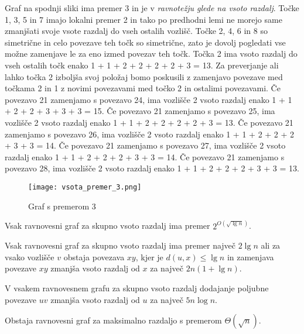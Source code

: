 \documentclass[fin1, tisk]{fmfdelo}
\begin{document}
\begin{dokaz}
Graf na spodnji sliki ima premer 3 in je v \textit{ravnotežju glede na vsoto razdalj}. Točke 1, 3, 5 in 7 imajo lokalni premer 2 in tako po predhodni lemi ne morejo same zmanjšati svoje vsote razdalj do vseh ostalih vozlišč. Točke 2, 4, 6 in 8 so simetrične in celo povezave teh točk so simetrične, zato je dovolj pogledati vse možne zamenjave le za eno izmed povezav teh točk. Točka 2 ima vsoto razdalj do vseh ostalih točk enako 1 + 1 + 2 + 2 + 2 + 2 + 3 = 13. Za preverjanje ali lahko točka 2 izboljša svoj položaj bomo poskusili z zamenjavo povezave med točkama 2 in 1 z novimi povezavami med točko 2 in ostalimi povezavami. Če povezavo 21 zamenjamo s povezavo 24, ima vozlišče 2 vsoto razdalj enako 1 + 1 + 2 + 2 + 3 + 3 + 3 = 15. Če povezavo 21 zamenjamo s povezavo 25, ima vozlišče 2 vsoto razdalj enako 1 + 1 + 2 + 2 + 2 + 2 + 3 = 13. Če povezavo 21 zamenjamo s povezavo 26, ima vozlišče 2 vsoto razdalj enako 1 + 1 + 2 + 2 + 2 + 3 + 3 = 14. Če povezavo 21 zamenjamo s povezavo 27, ima vozlišče 2 vsoto razdalj enako 1 + 1 + 2 + 2 + 2 + 3 + 3 = 14. Če povezavo 21 zamenjamo s povezavo 28, ima vozlišče 2 vsoto razdalj enako 1 + 1 + 2 + 2 + 2 + 3 + 3 = 13.
\end{dokaz}

\begin{figure}[h]
    \centering
    \texttt{[image: vsota\_premer\_3.png]}
    \caption{Graf s premerom 3}
\end{figure}

\begin{izrek}
Vsak ravnovesni graf za skupno vsoto razdalj ima premer \(2^{O(\sqrt{\lg n})}\).
\end{izrek}

\begin{lema}
Vsak ravnovesni graf za skupno vsoto razdalj ima premer največ \(2 \lg n\) ali za vsako vozlišče \(v\) obstaja povezava \(xy\), kjer je \(d(u, x) \leq \lg n\) in zamenjava povezave \(xy\) zmanjša vsoto razdalj od \(x\) za največ \(2n(1 + \lg n)\).
\end{lema}

\begin{lema}
V vsakem ravnovesnem grafu za skupno vsoto razdalj dodajanje poljubne povezave \(uv\) zmanjša vsoto razdalj od \(u\) za največ \(5n \log n\).
\end{lema}

\begin{izrek}
Obstaja ravnovesni graf za maksimalno razdaljo s premerom \(\Theta(\sqrt{n})\).
\end{izrek}
\end{document}
